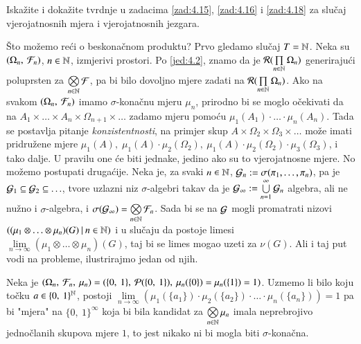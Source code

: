 \begin{zad} \label{zad:4.19}
    Iska\v zite i doka\v zite tvrdnje u zadacima \ref{zad:4.15}, \ref{zad:4.16} i \ref{zad:4.18} za slu\v caj vjerojatnosnih mjera i vjerojatnosnih jezgara.
\end{zad}

\v Sto mo\v zemo re\' ci o beskona\v cnom produktu?
Prvo gledamo slu\v caj $T = \mathbb{N}$. Neka su $({\Omega_n}, \: {\mathcal{F}_n})$, $n \in \mathbb{N}$, izmjerivi prostori. Po \eqref{jed:4.2}, znamo da je $\mathcal{R}({\prod\limits_{n \in \mathbb{N}}^{} \Omega_n})$ generiraju\' ci poluprsten za $\bigotimes\limits_{n \in \mathbb{N}}^{} \mathcal{F}$, pa bi bilo dovoljno mjere zadati na $\mathcal{R}({\prod\limits_{n \in \mathbb{N}}^{} \Omega_n})$.
Ako na svakom $({\Omega_n}, \: {\mathcal{F}_n})$ imamo $\sigma$-kona\v cnu mjeru $\mu_n$, prirodno bi se moglo o\v cekivati da na $A_1 \times \ldots \times A_n \times \Omega_{n + 1} \times \ldots$ zadamo mjeru pomo\' cu $\mu_1(A_1) \cdot \ldots \cdot \mu_n(A_n)$.
Tada se postavlja pitanje \emph{konzistentnosti}, na primjer skup $A \times \Omega_2 \times \Omega_3 \times \ldots$ mo\v ze imati pridru\v zene mjere $\mu_1(A), \; \mu_1(A) \cdot \mu_2(\Omega_2), \: \mu_1(A) \cdot \mu_2(\Omega_2) \cdot \mu_3 (\Omega_3)$, i tako dalje.
U pravilu one \' ce biti jednake, jedino ako su to vjerojatnosne mjere.
No mo\v zemo postupati druga\' cije.
Neka je, za svaki $n \in \mathbb{N}$, $\mathcal{G}_n := \sigma({\pi_1, \ldots, \pi_n})$, pa je $\mathcal{G}_1 \subseteq \mathcal{G}_2 \subseteq \ldots$, tvore uzlazni niz $\sigma$-algebri takav da je $\mathcal{G}_{\infty} := \bigcup\limits_{n = 1}^{\infty} \mathcal{G}_n$ algebra, ali ne nu\v zno i $\sigma$-algebra, i $\sigma({\mathcal{G}_{\infty}}) = \bigotimes\limits_{n \in \mathbb{N}}^{} \mathcal{F}_n$.
Sada bi se na $\mathcal{G}$ mogli promatrati nizovi $({(\mu_1 \otimes \ldots \otimes \mu_n)(G)} \: | \: {n \in \mathbb{N}})$ i u slu\v caju da postoje limesi $\lim\limits_{n \to \infty} (\mu_1 \otimes \ldots \otimes \mu_n)(G)$, taj bi se limes mogao uzeti za $\nu (G)$.
Ali i taj put vodi na probleme, ilustrirajmo jedan od njih.

\begin{pr}  \label{pr:4.20}
    Neka je $(\Omega_n, \: \mathcal{F}_n, \: \mu_n) = (\{0, \: 1\}, \: \mathcal{P}({\{0, \: 1\}}), \: \mu_n(\{0\}) = \mu_n (\{1\}) = 1)$.
    Uzmemo li bilo koju to\v cku $a \in \{ 0, \: 1 \}^{\mathbb{N}}$, postoji $\lim\limits_{n \to \infty} (\mu_1 (\{ a_1 \}) \cdot \mu_2 (\{ a_2 \}) \cdot \dots \cdot \mu_n (\{ a_n \}) ) = 1$ pa bi "mjera" na $\{ 0, \: 1 \}^{\infty}$ koja bi bila kandidat za $\bigotimes\limits_{n \in \mathbb{N}}^{} \mu_n$ imala neprebrojivo jedno\v clanih skupova mjere $1$, to jest nikako ni bi mogla biti $\sigma$-kona\v cna. 
\end{pr}

